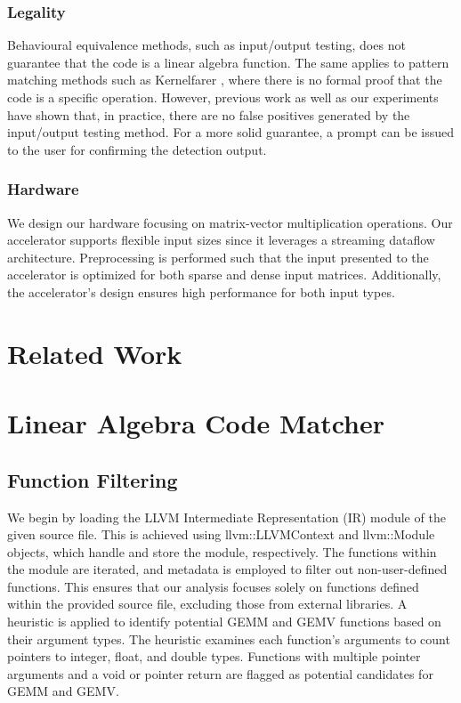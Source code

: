\documentclass[manuscript,screen,review]{acmart}
\begin{document}
\subsubsection{Legality} 
Behavioural equivalence methods, such as input/output testing, does not guarantee that the code is a linear algebra function. The same applies to pattern matching methods such as Kernelfarer \cite{kernelfarer}, where there is no formal proof that the code is a specific operation. However, previous work as well as our experiments \cite{ATC} have shown that, in practice, there are no false positives generated by the input/output testing method. For a more solid guarantee, a prompt can be issued to the user for confirming the detection output. 

\subsubsection{Hardware}
We design our hardware focusing on matrix-vector multiplication operations. Our accelerator supports flexible input sizes since it leverages a streaming dataflow architecture. Preprocessing is performed such that the input presented to the accelerator is optimized for both sparse and dense input matrices. Additionally, the accelerator's design ensures high performance for both input types.

\section{Related Work}

\section{Linear Algebra Code Matcher}
\subsection{Function Filtering}
We begin by loading the LLVM Intermediate Representation (IR) module of the given source file. This is achieved using llvm::LLVMContext and llvm::Module objects, which handle and store the module, respectively. The functions within the module are iterated, and metadata is employed to filter out non-user-defined functions. This ensures that our analysis focuses solely on functions defined within the provided source file, excluding those from external libraries. A heuristic is applied to identify potential GEMM and GEMV functions based on their argument types. The heuristic examines each function’s arguments to count pointers to integer, float, and double types. Functions with multiple pointer arguments and a void or pointer return are flagged as potential candidates for GEMM and GEMV.
\end{document}
